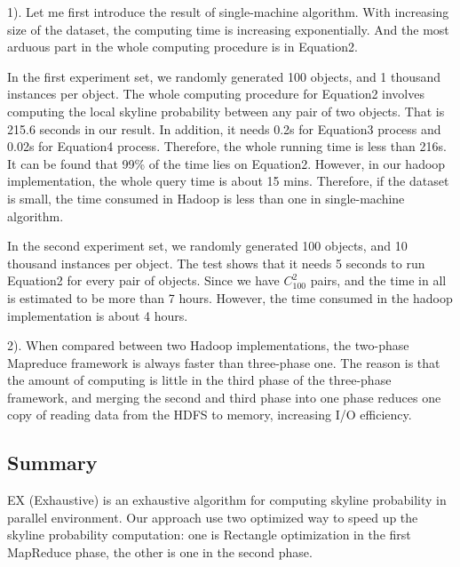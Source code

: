 1). Let me first introduce the result of single-machine algorithm. With increasing size of the dataset, the computing time is increasing exponentially. And the most arduous part in the whole computing procedure is in Equation2.

In the first experiment set, we randomly generated 100 objects, and 1 thousand instances per object. The whole computing procedure for Equation2 involves computing the local skyline probability between any pair of two objects. That is 215.6 seconds in our result. In addition, it needs 0.2s for Equation3 process and 0.02s for Equation4 process. Therefore, the whole running time is less than 216s. It can be found that 99\% of the time lies on Equation2. However, in our hadoop implementation, the whole query time is about 15 mins. Therefore, if the dataset is small, the time consumed in Hadoop is less than one in single-machine algorithm.

In the second experiment set, we randomly generated 100 objects, and 10 thousand instances per object. The test shows that it needs 5 seconds to run Equation2 for every pair of objects. Since we have \(C_{100}^{2}\) pairs, and the time in all is estimated to be more than 7 hours. However, the time consumed in the hadoop implementation is about 4 hours.

2). When compared between two Hadoop implementations, the two-phase Mapreduce framework is always faster than three-phase one. The reason is that the amount of computing is little in the third phase of the three-phase framework, and merging the second and third phase into one phase reduces one copy of reading data from the HDFS to memory, increasing I/O efficiency.

\subsection{Summary}
EX (Exhaustive) is an exhaustive algorithm for computing skyline probability in parallel environment. Our approach use two optimized way to speed up the skyline probability computation: one is Rectangle optimization in the first MapReduce phase, the other is one in the second phase.

